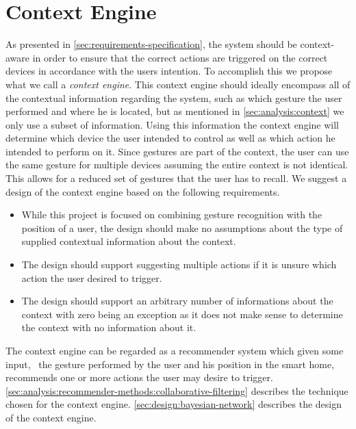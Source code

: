 \section{Context Engine}
\label{sec:analysis:context-engine}

As presented in \cref{sec:requirements-specification}, the system should be context-aware in order to ensure that the correct actions are triggered on the correct devices in accordance with the users intention.
To accomplish this we propose what we call a \emph{context engine}.
This context engine should ideally encompass all of the contextual information regarding the system, such as which gesture the user performed and where he is located, but as mentioned in \cref{sec:analysis:context} we only use a subset of information. 
Using this information the context engine will determine which device the user intended to control as well as which action he intended to perform on it.
Since gestures are part of the context, the user can use the same gesture for multiple devices assuming the entire context is not identical.
This allows for a reduced set of gestures that the user has to recall.
We suggest a design of the context engine based on the following requirements.

\begin{itemize}
\item While this project is focused on combining gesture recognition with the position of a user, the design should make no assumptions about the type of supplied contextual information about the context.
\item The design should support suggesting multiple actions if it is unsure which action the user desired to trigger.
\item The design should support an arbitrary number of informations about the context with zero being an exception as it does not make sense to determine the context with no information about it.
\end{itemize}

The context engine can be regarded as a recommender system which given some input, \eg~the gesture performed by the user and his position in the smart home, recommends one or more actions the user may desire to trigger. \cref{sec:analysis:recommender-methods:collaborative-filtering} describes the technique chosen for the context engine. \cref{sec:design:bayesian-network} describes the design of the context engine.

